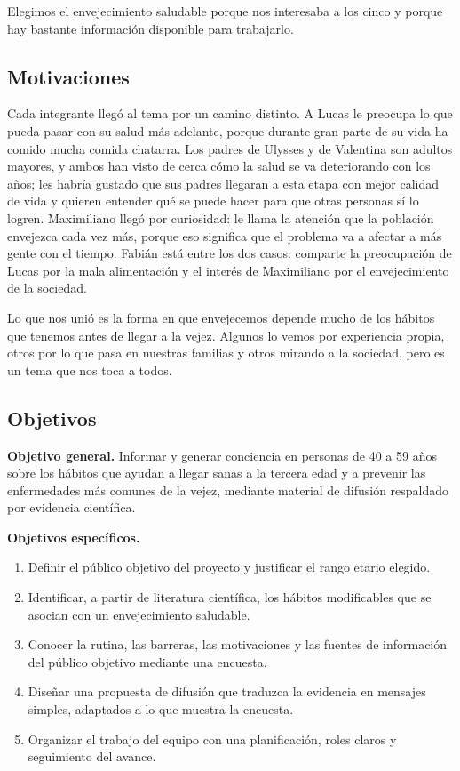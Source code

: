 \documentclass[12pt, letterpaper, table, xcdraw]{extarticle}
\begin{document}
Elegimos el envejecimiento saludable porque nos interesaba a los cinco y porque hay bastante información disponible para trabajarlo.


{}
\subsection*{Motivaciones}

Cada integrante llegó al tema por un camino distinto. A Lucas le preocupa lo que pueda pasar con su salud más adelante, porque durante gran parte de su vida ha comido mucha comida chatarra. Los padres de Ulysses y de Valentina son adultos mayores, y ambos han visto de cerca cómo la salud se va deteriorando con los años; les habría gustado que sus padres llegaran a esta etapa con mejor calidad de vida y quieren entender qué se puede hacer para que otras personas sí lo logren. Maximiliano llegó por curiosidad: le llama la atención que la población envejezca cada vez más, porque eso significa que el problema va a afectar a más gente con el tiempo. Fabián está entre los dos casos: comparte la preocupación de Lucas por la mala alimentación y el interés de Maximiliano por el envejecimiento de la sociedad.

Lo que nos unió es la forma en que envejecemos depende mucho de los hábitos que tenemos antes de llegar a la vejez. Algunos lo vemos por experiencia propia, otros por lo que pasa en nuestras familias y otros mirando a la sociedad, pero es un tema que nos toca a todos.

{}
\subsection*{Objetivos}

\textbf{Objetivo general.} Informar y generar conciencia en personas de 40 a 59 años sobre los hábitos que ayudan a llegar sanas a la tercera edad y a prevenir las enfermedades más comunes de la vejez, mediante material de difusión respaldado por evidencia científica.

\textbf{Objetivos específicos.}
\begin{enumerate}
    \item Definir el público objetivo del proyecto y justificar el rango etario elegido.
    \item Identificar, a partir de literatura científica, los hábitos modificables que se asocian con un envejecimiento saludable.
    \item Conocer la rutina, las barreras, las motivaciones y las fuentes de información del público objetivo mediante una encuesta.
    \item Diseñar una propuesta de difusión que traduzca la evidencia en mensajes simples, adaptados a lo que muestra la encuesta.
    \item Organizar el trabajo del equipo con una planificación, roles claros y seguimiento del avance.
\end{enumerate}
\end{document}

